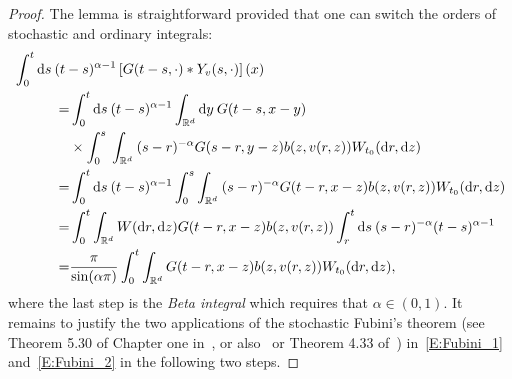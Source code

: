 \documentclass[sn-mathphys]{sn-jnl}%
\renewcommand{\R}{\mathbb{R}}
\newcommand{\ud}{\ensuremath{\mathrm{d}}}
\numberwithin{equation}{section}
\theoremstyle{thmstyleone}%
\theoremstyle{thmstyletwo}%
\theoremstyle{thmstylethree}%
\begin{document}
\begin{proof}
  The lemma is straightforward provided that one can switch the orders of stochastic and ordinary
  integrals:
  \begin{align}
    \MoveEqLeft[4] \int_0^t \ud s\: (t-s)^{\alpha-1}\left[G(t-s,\cdot)*Y_v(s,\cdot)\right](x) \notag \\
    = & \int_0^t \ud s\: (t-s)^{\alpha-1}\int_{\R^d} \ud y\: G(t-s,x-y) \notag                                                                \\
      & \times \int_0^s\: \int_{\R^d} \: (s-r)^{-\alpha}G(s-r,y-z)b(z,v(r,z))W_{t_0}(\ud r,\ud z) \notag                                      \\
    = & \int_0^t \ud s\: (t-s)^{\alpha-1} \int_0^s \int_{\R^d} \: (s-r)^{-\alpha}G(t-r,x-z)b(z,v(r,z))W_{t_0}(\ud r,\ud z) \label{E:Fubini_1} \\
    = & \int_0^t \int_{\R^d} W(\ud r,\ud z)G(t-r,x-z)b(z,v(r,z)) \int_r^t \ud s\: (s-r)^{-\alpha} (t-s)^{\alpha-1}\label{E:Fubini_2}          \\
    = & \dfrac{\pi}{\sin(\alpha \pi)}\int_0^t \int_{\R^d} G(t-r,x-z)b(z,v(r,z)) W_{t_0}(\ud r,\ud z),\notag
  \end{align}
  where the last step is the \textit{Beta integral} which requires that $\alpha\in (0,1)$. It
  remains to justify the two applications of the stochastic Fubini's theorem (see Theorem 5.30 of
  Chapter one in~\cite{dalang.khoshnevisan.ea:09:minicourse}, or also~\cite{walsh:86:introduction}
  or Theorem 4.33 of~\cite{da-prato.zabczyk:14:stochastic}) in~\eqref{E:Fubini_1}
  and~\eqref{E:Fubini_2} in the following two steps. \bigskip


\end{proof}
\end{document}
